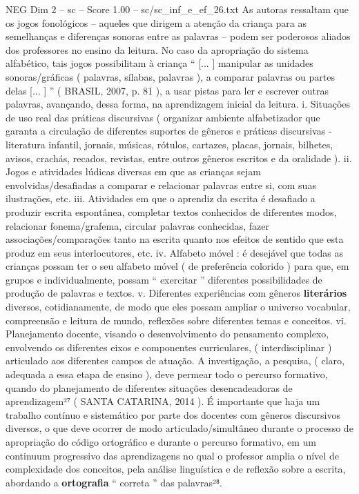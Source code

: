 \begin{textsample}{NEG Dim 2 – sc – Score 1.00 – sc/sc\_inf\_e\_ef\_26.txt}
As autoras ressaltam que os jogos fonológicos – aqueles que dirigem a atenção da criança para as semelhanças e diferenças sonoras entre as palavras – podem ser poderosos aliados dos professores no ensino da leitura.
No caso da apropriação do sistema alfabético, tais jogos possibilitam à criança “ [... ] manipular as unidades sonoras/gráficas ( palavras, sílabas, palavras ), a comparar palavras ou partes delas [... ] ” ( BRASIL, 2007, p. 81 ), a usar pistas para ler e escrever outras palavras, avançando, dessa forma, na aprendizagem inicial da leitura. i.
Situações de uso real das práticas discursivas ( organizar ambiente alfabetizador que garanta a circulação de diferentes suportes de gêneros e práticas discursivas - literatura infantil, jornais, músicas, rótulos, cartazes, placas, jornais, bilhetes, avisos, crachás, recados, revistas, entre outros gêneros escritos e da oralidade ). ii.
Jogos e atividades lúdicas diversas em que as crianças sejam envolvidas/desafiadas a comparar e relacionar palavras entre si, com suas ilustrações, etc. iii.
Atividades em que o aprendiz da escrita é desafiado a produzir escrita espontânea, completar textos conhecidos de diferentes modos, relacionar fonema/grafema, circular palavras conhecidas, fazer associações/comparações tanto na escrita quanto nos efeitos de sentido que esta produz em seus interlocutores, etc. iv.
Alfabeto móvel : é desejável que todas as crianças possam ter o seu alfabeto móvel ( de preferência colorido ) para que, em grupos e individualmente, possam “ exercitar ” diferentes possibilidades de produção de palavras e textos. v.
Diferentes experiências com gêneros \textbf{literários} diversos, cotidianamente, de modo que eles possam ampliar o universo vocabular, compreensão e leitura de mundo, reflexões sobre diferentes temas e conceitos. vi.
Planejamento docente, visando o desenvolvimento do pensamento complexo, envolvendo os diferentes eixos e componentes curriculares, ( interdisciplinar ) articulado aos diferentes campos de atuação.
A investigação, a pesquisa, ( claro, adequada a essa etapa de ensino ), deve permear todo o percurso formativo, quando do planejamento de diferentes situações desencadeadoras de aprendizagem²⁷ ( SANTA CATARINA, 2014 ).
É importante que haja um trabalho contínuo e sistemático por parte dos docentes com gêneros discursivos diversos, o que deve ocorrer de modo articulado/simultâneo durante o processo de apropriação do código ortográfico e durante o percurso formativo, em um continuum progressivo das aprendizagens no qual o professor amplia o nível de complexidade dos conceitos, pela análise linguística e de reflexão sobre a escrita, abordando a \textbf{ortografia} “ correta ” das palavras²⁸.

\end{textsample}
